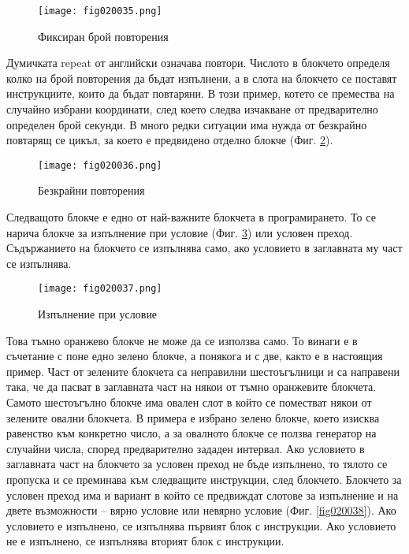 \begin{figure}[H]
  \centering
  \texttt{[image: fig020035.png]}
  \caption{Фиксиран брой повторения}
\label{fig020035}
\end{figure}

Думичката repeat от английски означава повтори. Числото в блокчето определя колко на брой повторения да бъдат изпълнени, а в слота на блокчето се поставят инструкциите, които да бъдат повтаряни. В този пример, котето се премества на случайно избрани координати, след което следва изчакване от предварително определен брой секунди. В много редки ситуации има нужда от безкрайно повтарящ се цикъл, за което е предвидено отделно блокче (Фиг. \ref{fig020036}).

\begin{figure}[H]
  \centering
  \texttt{[image: fig020036.png]}
  \caption{Безкрайни повторения}
\label{fig020036}
\end{figure}

Следващото блокче е едно от най-важните блокчета в програмирането. То се нарича блокче за изпълнение при условие (Фиг. \ref{fig020037}) или условен преход. Съдържанието на блокчето се изпълнява само, ако условието в заглавната му част се изпълнява.

\begin{figure}[H]
  \centering
  \texttt{[image: fig020037.png]}
  \caption{Изпълнение при условие}
\label{fig020037}
\end{figure}

Това тъмно оранжево блокче не може да се използва само. То винаги е в съчетание с поне едно зелено блокче, а понякога и с две, както е в настоящия пример. Част от зелените блокчета са неправилни шестоъгълници и са направени така, че да пасват в заглавната част на някои от тъмно оранжевите блокчета. Самото шестоъгълно блокче има овален слот в който се поместват някои от зелените овални блокчета. В примера е избрано зелено блокче, което изисква равенство към конкретно число, а за овалното блокче се ползва генератор на случайни числа, според предварително зададен интервал. Ако условието в заглавната част на блокчето за условен преход не бъде изпълнено, то тялото се пропуска и се преминава към следващите инструкции, след блокчето. Блокчето за условен преход има и вариант в който се предвиждат слотове за изпълнение и на двете възможности – вярно условие или невярно условие (Фиг. \ref{fig020038}). Ако условието е изпълнено, се изпълнява първият блок с инструкции. Ако условието не е изпълнено, се изпълнява вторият блок с инструкции.

